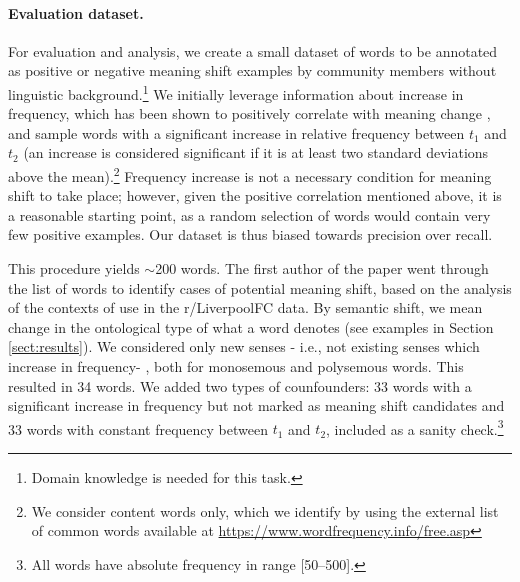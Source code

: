 \paragraph{Evaluation dataset.} 
For evaluation and analysis, we create a small dataset of words to be annotated 
as positive or negative meaning shift examples by community members without linguistic background.\footnote{Domain knowledge is needed for this task.}
We initially leverage information about increase
in frequency, which has been shown to positively correlate with
meaning change
\cite{wijaya2011understanding,kulkarni2015statistically}, and sample
words with a significant increase in relative frequency between $t_1$ and $t_2$
(an increase is considered significant if it is
at least two standard deviations above the mean).\footnote{We consider
  content words only, which we identify by using the external list
  of common words available at
  \url{https://www.wordfrequency.info/free.asp}} Frequency increase is
not a necessary condition for meaning shift to take place; however,
given the positive correlation mentioned above, it is a reasonable
starting point, as a random selection of words would contain very few
positive examples. Our dataset is thus biased towards precision
  over recall.

This procedure yields $\sim$200 words. 
The first author of the paper went through the list of words to
identify cases of potential meaning shift, based on the analysis of the contexts
of use in the r/LiverpoolFC data.
By semantic shift, we mean change in the ontological type of what a word denotes (see examples in Section \ref{sect:results}). We considered only new senses - i.e., not existing senses which increase in frequency- , both for monosemous and polysemous words.
This resulted in 34 words.
We added two types of counfounders:
33 words with a significant increase in frequency but not marked as meaning shift candidates and 33 words with
constant frequency between $t_1$ and $t_2$, included as a sanity check.\footnote{All words have absolute frequency in range [50--500].} 

